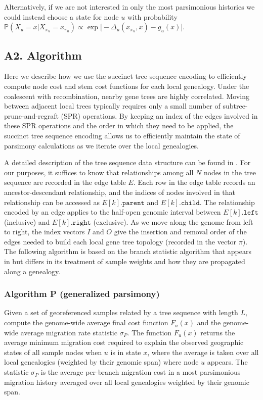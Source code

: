Alternatively, if we are not interested in only the most parsimonious histories 
we could instead choose a state for node $u$ with probability 
$\mathbb{P}(X_u = x | X_{\pi_u} = x_{\pi_u}) \propto \exp{\bigl[-\Delta_u(x_{\pi_u}, x) - g_u(x)\bigr]}$.
\fi

\subsection*{A2. Algorithm}

Here we describe how we use the succinct tree sequence encoding
\citep{Kelleher_etal_2016} to efficiently compute node cost and stem cost 
functions for each local genealogy. Under the coalescent with recombination, 
nearby gene trees are highly correlated. Moving between adjacent local trees 
typically requires only a small number of subtree-prune-and-regraft (SPR) 
operations. By keeping an index of the edges involved in these SPR operations 
and the order in which they need to be applied, the succinct tree sequence 
encoding allows us to efficiently maintain the state of parsimony calculations 
as we iterate over the local genealogies.

A detailed description of the tree sequence data structure can be found in
\citet{Kelleher_etal_2016}. For our purposes, it suffices to know that
relationships among all $N$ nodes in the tree sequence are recorded in the edge 
table $E$. Each row in the edge table records an ancestor-descendant
relationship, and the indices of nodes involved in that relationship can be 
accessed as $E[k].\texttt{parent}$ and  $E[k].\texttt{child}$. The relationship 
encoded by an edge applies to the half-open genomic interval between $E[k].\texttt{left}$ 
(inclusive) and $E[k].\texttt{right}$ (exclusive). As we move along the genome 
from left to right, the index vectors $I$ and $O$ give the insertion and
removal order of the edges needed to build each local gene tree topology 
(recorded in the vector $\pi$). The following algorithm is based on
the branch statistic algorithm that appears in \citet{Ralph_etal_2020} but
differs in its treatment of sample weights and how they are propagated along
a genealogy.

\subsubsection*{Algorithm P (generalized parsimony)}

Given a set of georeferenced samples related by a tree sequence with length
$L$, compute the genome-wide average final cost function $F_u(x)$ and the
genome-wide average migration rate statistic $\sigma_P$. The function $F_u(x)$ 
returns the average minimum migration cost required to explain the observed 
geographic states of all sample nodes when $u$ is in state $x$, where the 
average is taken over all local genealogies (weighted by their genomic span)
where node $u$ appears. The statistic $\sigma_P$ is the average per-branch 
migration cost in a most parsimonious migration history averaged over all
local genealogies weighted by their genomic span.

